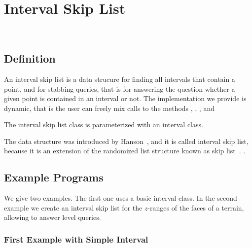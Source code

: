 

\ccParDims

\chapter{Interval Skip List}
\label{chapter_Interval_skip_list}
\\




\section{Definition}
  
An interval skip list is a data strucure for finding all intervals 
that contain a point, and for stabbing queries, that is for answering 
the question whether a given point is contained in an interval or not. 
The implementation we provide is dynamic, that is the user can freely
mix calls  to the methods , , 
, and 

The interval skip list class is parameterized with an interval class.

The data structure was introduced by Hanson~\cite{}, and it is called
interval skip list, because it is an extension of the randomized list
structure known as skip list~\cite{}. .
 
\section{Example Programs}
\label{sectionIntervalskiplistExamples}

We give two examples. The first one uses a basic interval class.  In
the second example we create an interval skip list for the $z$-ranges
of the faces of a terrain, allowing to answer level queries.

\subsection{First Example with Simple Interval}

